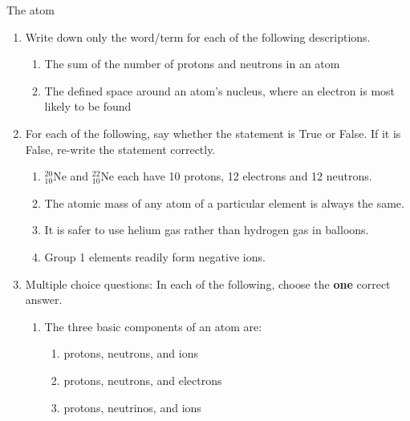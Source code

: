 \begin{eocexercises}{The atom}
            \nopagebreak \noindent
      \label{m38741*id263110}\begin{enumerate}[noitemsep, label=\textbf{\arabic*}. ] 
            \label{m38741*uid189}\item Write down only the word/term for each of the following descriptions.
\label{m38741*id263126}\begin{enumerate}[noitemsep, label=\textbf{\alph*}. ] 
            \label{m38741*uid190}\item The sum of the number of protons and neutrons in an atom
\label{m38741*uid191}\item The defined space around an atom's nucleus, where an electron is most likely to be found
\end{enumerate}
                \label{m38741*uid192}\item For each of the following, say whether the statement is True or False. If it is False, re-write the statement correctly.
\label{m38741*id263169}\begin{enumerate}[noitemsep, label=\textbf{\alph*}. ] 
            \label{m38741*uid193}\item $_{10}^{20}\text{Ne}$ and $_{10}^{22}\text{Ne}$ each have 10 protons, 12 electrons and 12 neutrons.
\label{m38741*uid194}\item The atomic mass of any atom of a particular element is always the same.
\label{m38741*uid195}\item It is safer to use helium gas rather than hydrogen gas in balloons.
\label{m38741*uid196}\item Group 1 elements readily form negative ions.
\end{enumerate}
                \label{m38741*uid197}\item Multiple choice questions: In each of the following, choose the \textbf{one} correct answer.
\label{m38741*id263273}\begin{enumerate}[noitemsep, label=\textbf{\alph*}. ] 
            \label{m38741*uid198}\item The three basic components of an atom are:
\label{m38741*id263289}\begin{enumerate}[noitemsep, label=\textbf{\roman*}. ] 
            \label{m38741*uid199}\item protons, neutrons, and ions
\label{m38741*uid200}\item protons, neutrons, and electrons
\label{m38741*uid201}\item protons, neutrinos, and ions

\end{enumerate}
\end{enumerate}
\end{enumerate}
\end{eocexercises}
